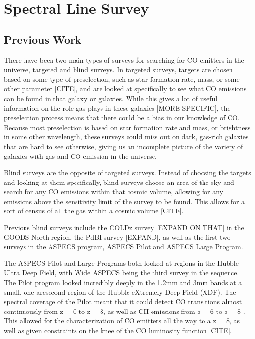 \chapter{Spectral Line Survey}

\section{Previous Work}

There have been two main types of surveys for searching for CO emitters in the universe, targeted and blind surveys. In targeted surveys, targets are chosen based on some type of preselection, such as star formation rate, mass, or some other parameter [CITE], and are looked at specifically to see what CO emissions can be found in that galaxy or galaxies. While this gives a lot of useful information on the role gas plays in these galaxies [MORE SPECIFIC], the preselection process means that there could be a bias in our knowledge of CO. Because most preselection is based on star formation rate and mass, or brightness in some other wavelength, these surveys could miss out on dark, gas-rich galaxies that are hard to see otherwise, giving us an incomplete picture of the variety of galaxies with gas and CO emission in the universe. 

Blind surveys are the opposite of targeted surveys. Instead of choosing the targets and looking at them specifically, blind surveys choose an area of the sky and search for any CO emissions within that cosmic volume, allowing for any emissions above the sensitivity limit of the survey to be found. This allows for a sort of census of all the gas within a cosmic volume [CITE]. 

Previous blind surveys include the COLDz survey [EXPAND ON THAT] in the GOODS-North region, the PdBI survey [EXPAND], as well as the first two surveys in the ASPECS program, ASPECS Pilot and ASPECS Large Program. 

The ASPECS Pilot and Large Programs both looked at regions in the Hubble Ultra Deep Field, with Wide ASPECS being the third survey in the sequence. The Pilot program looked incredibly deeply in the 1.2mm and 3mm bands at a small, one arcsecond region of the Hubble eXtremely Deep Field (XDF). The spectral coverage of the Pilot meant that it could detect CO transitions almost continuously from z = 0 to z = 8, as well as CII emissions from z = 6 to z = 8 \cite{walter2016alma}. This allowed for the characterization of CO emitters all the way to a z = 8, as well as given constraints on the knee of the CO luminosity function [CITE]. 


